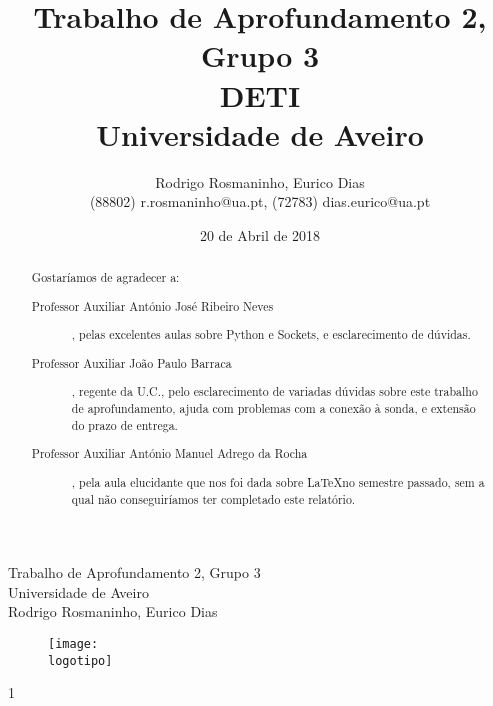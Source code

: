 \documentclass{report}
\begin{document}
%
\def\titulo{Trabalho de Aprofundamento 2, Grupo 3}
\def\data{20 de Abril de 2018}
\def\autores{Rodrigo Rosmaninho, Eurico Dias}
\def\autorescontactos{(88802) r.rosmaninho@ua.pt, (72783) dias.eurico@ua.pt}
\def\versao{1}
\def\departamento{DETI}
\def\empresa{Universidade de Aveiro}
\def\logotipo{ua.pdf}
%
%
\begin{titlepage}

\begin{center}
%
\vspace*{50mm}
%
{\Huge \titulo}\\ 
%
\vspace{10mm}
%
{\Large \empresa}\\
%
\vspace{10mm}
%
{\LARGE \autores}\\ 
%
\vspace{30mm}
%
\begin{figure}[h]
\center
\texttt{[image: \\logotipo]}
\end{figure}
%
\vspace{30mm}
\end{center}
%
\begin{flushright}
\versao
\end{flushright}
\end{titlepage}

\title{%
{\Huge\textbf{\titulo}}\\
{\Large \departamento\\ \empresa}
}
%
\author{%
    \autores \\
    \autorescontactos
}
%
\date{\data}
%
\maketitle


\renewcommand{\abstractname}{Agradecimentos}
\begin{abstract}
Gostaríamos de agradecer a: 

\begin{description}
	\item[Professor Auxiliar António José Ribeiro Neves], pelas excelentes aulas sobre Python e Sockets, e esclarecimento de dúvidas.
	
	\item[Professor Auxiliar João Paulo Barraca], regente da U.C., pelo esclarecimento de variadas dúvidas sobre este trabalho de aprofundamento, ajuda com problemas com a conexão à sonda, e extensão do prazo de entrega.
	
	\item[Professor Auxiliar António Manuel Adrego da Rocha ], pela aula elucidante que nos foi dada sobre \LaTeX no semestre passado, sem a qual não conseguiríamos ter completado este relatório.
\end{description}
\end{abstract}
\end{document}
